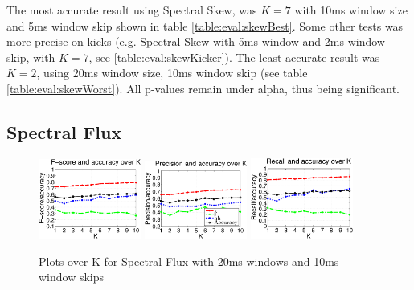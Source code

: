 		The most accurate result using Spectral Skew, was $K=7$ with 10ms window size and 5ms window skip shown in table \ref{table:eval:skewBest}. Some other tests was more precise on kicks (e.g. Spectral Skew with 5ms window and 2ms window skip, with $K=7$, see \ref{table:eval:skewKicker}). The least accurate result was $K=2$, using 20ms window size, 10ms window skip (see table \ref{table:eval:skewWorst}). All p-values remain under alpha, thus being significant.
	
	\subsection{Spectral Flux}
		
		\begin{figure}
		
		
			\centering\includegraphics[width=0.3\textwidth]{tex/appendices/test/sflux2010FP.png}
			\centering\includegraphics[width=0.3\textwidth]{tex/appendices/test/sflux2010_P.png}
			\centering\includegraphics[width=0.3\textwidth]{tex/appendices/test/sflux2010_R.png}
			
			\caption{Plots over K for Spectral Flux with 20ms windows and 10ms window skips}
		\end{figure}
